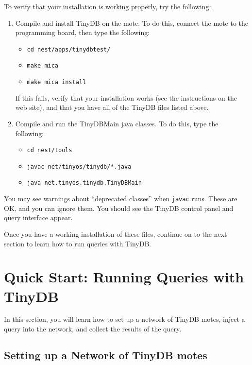 \documentclass[11pt]{article}
\renewcommand{\baselinestretch}{1.2}
\begin{document}
\renewcommand{\baselinestretch}{1.2}\rm

To verify that your installation is working properly, try the following:

\begin{enumerate}
\item Compile and install TinyDB on the mote.  To do this, connect the mote to
the programming board, then type the following:
\begin{itemize}
\item {\tt cd nest/apps/tinydbtest/}
\item {\tt make mica}
\item {\tt make mica install}
\end{itemize}
If this fails, verify that your installation works (see the instructions on the web
site), and that you have all of the TinyDB files listed above.
\item Compile and run the TinyDBMain java classes.  To do this, type the following:
\begin{itemize}
\item {\tt cd nest/tools}
\item {\tt javac net/tinyos/tinydb/*.java}
\item {\tt java net.tinyos.tinydb.TinyDBMain}
\end{itemize}
\end{enumerate}
You may see warnings about ``deprecated classes'' when {\tt javac}
runs.  These are OK, and you can ignore them.  
You should see the TinyDB control panel and query interface appear.

Once you have a working installation of these files, continue on to the next section
to learn how to run queries with TinyDB.

\section{Quick Start:  Running Queries with TinyDB} \label{sec:runningqueries}

In this section, you will learn how to set up a network of TinyDB motes, inject a query
into the network, and collect the results of the query.  

\subsection{Setting up a Network of TinyDB motes}
\end{document}
